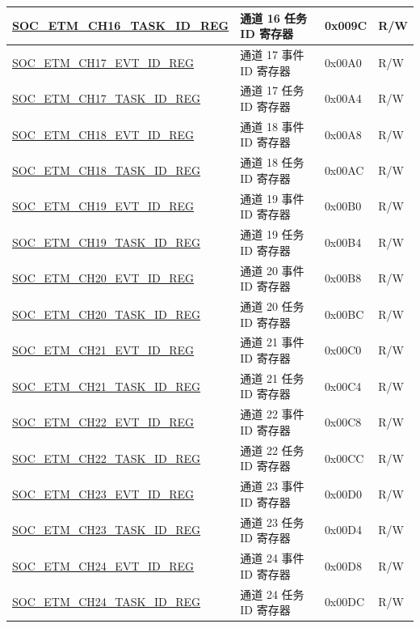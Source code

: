 \begin{longtable}{ | p{6cm} | p{6.2cm} | p{1.3cm} | p{2cm} | }
\hyperref[regdesc:SOCETMCHNTASKIDREG]{SOC\_ETM\_CH16\_TASK\_ID\_REG} & 通道 16 任务 ID 寄存器 & 0x009C & R/W \\ \hline
\hyperref[regdesc:SOCETMCHNEVTIDREG]{SOC\_ETM\_CH17\_EVT\_ID\_REG} & 通道 17 事件 ID 寄存器 & 0x00A0 & R/W \\ \hline
\hyperref[regdesc:SOCETMCHNTASKIDREG]{SOC\_ETM\_CH17\_TASK\_ID\_REG} & 通道 17 任务 ID 寄存器 & 0x00A4 & R/W \\ \hline
\hyperref[regdesc:SOCETMCHNEVTIDREG]{SOC\_ETM\_CH18\_EVT\_ID\_REG} & 通道 18 事件 ID 寄存器 & 0x00A8 & R/W \\ \hline
\hyperref[regdesc:SOCETMCHNTASKIDREG]{SOC\_ETM\_CH18\_TASK\_ID\_REG} & 通道 18 任务 ID 寄存器 & 0x00AC & R/W \\ \hline
\hyperref[regdesc:SOCETMCHNEVTIDREG]{SOC\_ETM\_CH19\_EVT\_ID\_REG} & 通道 19 事件 ID 寄存器 & 0x00B0 & R/W \\ \hline
\hyperref[regdesc:SOCETMCHNTASKIDREG]{SOC\_ETM\_CH19\_TASK\_ID\_REG} & 通道 19 任务 ID 寄存器 & 0x00B4 & R/W \\ \hline
\hyperref[regdesc:SOCETMCHNEVTIDREG]{SOC\_ETM\_CH20\_EVT\_ID\_REG} & 通道 20 事件 ID 寄存器 & 0x00B8 & R/W \\ \hline
\hyperref[regdesc:SOCETMCHNTASKIDREG]{SOC\_ETM\_CH20\_TASK\_ID\_REG} & 通道 20 任务 ID 寄存器 & 0x00BC & R/W \\ \hline
\hyperref[regdesc:SOCETMCHNEVTIDREG]{SOC\_ETM\_CH21\_EVT\_ID\_REG} & 通道 21 事件 ID 寄存器 & 0x00C0 & R/W \\ \hline
\hyperref[regdesc:SOCETMCHNTASKIDREG]{SOC\_ETM\_CH21\_TASK\_ID\_REG} & 通道 21 任务 ID 寄存器 & 0x00C4 & R/W \\ \hline
\hyperref[regdesc:SOCETMCHNEVTIDREG]{SOC\_ETM\_CH22\_EVT\_ID\_REG} & 通道 22 事件 ID 寄存器 & 0x00C8 & R/W \\ \hline
\hyperref[regdesc:SOCETMCHNTASKIDREG]{SOC\_ETM\_CH22\_TASK\_ID\_REG} & 通道 22 任务 ID 寄存器 & 0x00CC & R/W \\ \hline
\hyperref[regdesc:SOCETMCHNEVTIDREG]{SOC\_ETM\_CH23\_EVT\_ID\_REG} & 通道 23 事件 ID 寄存器 & 0x00D0 & R/W \\ \hline
\hyperref[regdesc:SOCETMCHNTASKIDREG]{SOC\_ETM\_CH23\_TASK\_ID\_REG} & 通道 23 任务 ID 寄存器 & 0x00D4 & R/W \\ \hline
\hyperref[regdesc:SOCETMCHNEVTIDREG]{SOC\_ETM\_CH24\_EVT\_ID\_REG} & 通道 24 事件 ID 寄存器 & 0x00D8 & R/W \\ \hline
\hyperref[regdesc:SOCETMCHNTASKIDREG]{SOC\_ETM\_CH24\_TASK\_ID\_REG} & 通道 24 任务 ID 寄存器 & 0x00DC & R/W \\ \hline

\end{longtable}
